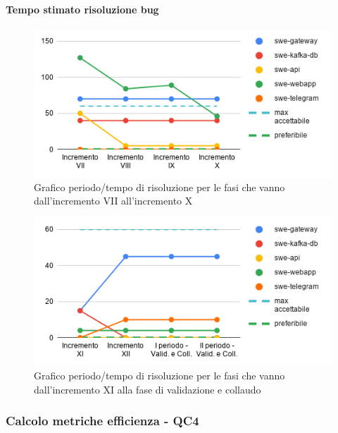 \paragraph{Tempo stimato risoluzione bug}
	\begin{figure}[H]
			\centering
			\includegraphics[width=0.8\linewidth]{./res/images/QM-PROD-7-TBUG.png}
			\caption{Grafico periodo/tempo di risoluzione per le fasi che vanno dall'incremento VII all'incremento X}
			\label{fig:Grafico periodo/tempo di risoluzione per le fasi che vanno dall'incremento VII all'incremento X}
	\end{figure}
	\begin{figure}[H]
			\centering
			\includegraphics[width=0.8\linewidth]{./res/images/QM-PROD-7-TBUG_1.png}
			\caption{Grafico periodo/tempo di risoluzione per le fasi che vanno dall'incremento XI alla fase di validazione e collaudo}
			\label{fig:Grafico periodo/tempo di risoluzione per le fasi che vanno dall'incremento XI alla fase di validazione e collaudo}
	\end{figure}

\subsubsection{Calcolo metriche efficienza - QC4}
